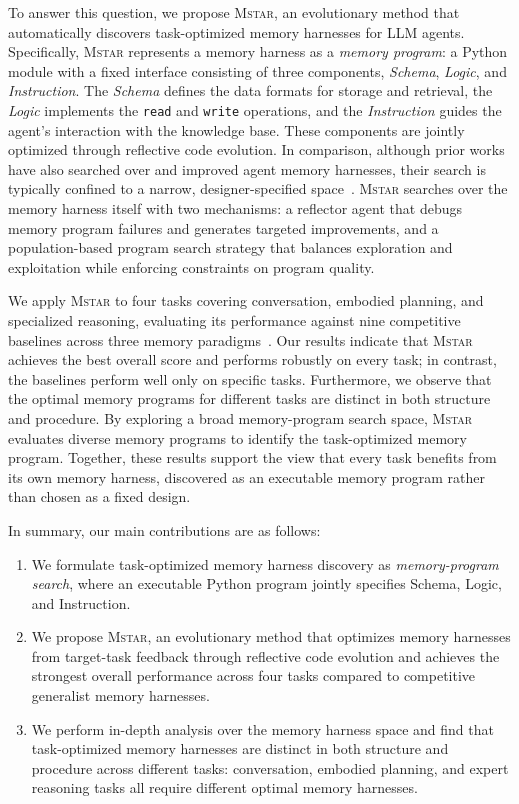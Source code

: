 \documentclass{article}
\newcommand{\sysname}{\textsc{Mstar}}
\begin{document}
To answer this question, we propose \sysname{}, an evolutionary method that automatically discovers task-optimized memory harnesses for LLM agents.
Specifically, \sysname{} represents a memory harness as a \textit{memory program}: a Python module with a fixed interface consisting of three components, \textit{Schema}, \textit{Logic}, and \textit{Instruction}.
The \textit{Schema} defines the data formats for storage and retrieval, the \textit{Logic} implements the \texttt{read} and \texttt{write} operations, and the \textit{Instruction} guides the agent's interaction with the knowledge base.
These components are jointly optimized through reflective code evolution.
In comparison, although prior works have also searched over and improved agent memory harnesses, their search is typically confined to a narrow, designer-specified space~\citep{zhao2024expel,cai2025flex,memskill,memevolve,gepa}.
\sysname{} searches over the memory harness itself with two mechanisms: a reflector agent that debugs memory program failures and generates targeted improvements, and a population-based program search strategy that balances exploration and exploitation while enforcing constraints on program quality.


We apply \sysname{} to four tasks covering conversation, embodied planning, and specialized reasoning, evaluating its performance against nine competitive baselines across three memory paradigms~\citep{locomo,alfworld,healthbench,prbench}.
Our results indicate that \sysname{} achieves the best overall score and performs robustly on every task; in contrast, the baselines perform well only on specific tasks.
Furthermore, we observe that the optimal memory programs for different tasks are distinct in both structure and procedure.
By exploring a broad memory-program search space, \sysname{} evaluates diverse memory programs to identify the task-optimized memory program.
Together, these results support the view that every task benefits from its own memory harness, discovered as an executable memory program rather than chosen as a fixed design.

In summary, our main contributions are as follows:
\begin{enumerate}
    \item We formulate task-optimized memory harness discovery as \textit{memory-program search}, where an executable Python program jointly specifies Schema, Logic, and Instruction.
    \item We propose \sysname{}, an evolutionary method that optimizes memory harnesses from target-task feedback through reflective code evolution and achieves the strongest overall performance across four tasks compared to competitive generalist memory harnesses.
    \item We perform in-depth analysis over the memory harness space and find that task-optimized memory harnesses are distinct in both structure and procedure across different tasks: conversation, embodied planning, and expert reasoning tasks all require different optimal memory harnesses.
\end{enumerate}
\end{document}
